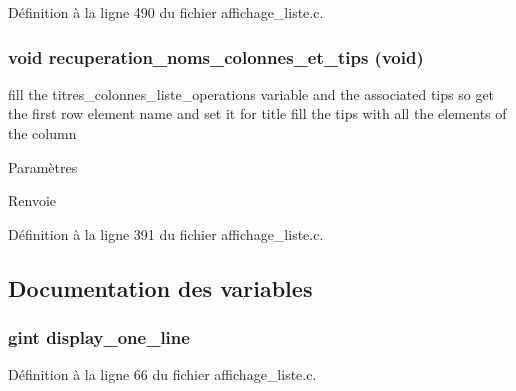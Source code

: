 Définition à la ligne 490 du fichier affichage\_\-liste.c.

\subsubsection[{recuperation\_\-noms\_\-colonnes\_\-et\_\-tips}]{\setlength{\rightskip}{0pt plus 5cm}void recuperation\_\-noms\_\-colonnes\_\-et\_\-tips (void)}\label{affichage__liste_8c_a0c0358b4457dcb87adf267e8fd04d971}
fill the titres\_\-colonnes\_\-liste\_\-operations variable and the associated tips so get the first row element name and set it for title fill the tips with all the elements of the column


\begin{DoxyParams}{Paramètres}
\item[{\em }]\end{DoxyParams}
\begin{DoxyReturn}{Renvoie}

\end{DoxyReturn}


Définition à la ligne 391 du fichier affichage\_\-liste.c.



\subsection{Documentation des variables}
\subsubsection[{display\_\-one\_\-line}]{\setlength{\rightskip}{0pt plus 5cm}gint {\bf display\_\-one\_\-line}}\label{affichage__liste_8c_a36eb372c7727c89f6ed96a3756a28740}


Définition à la ligne 66 du fichier affichage\_\-liste.c.

